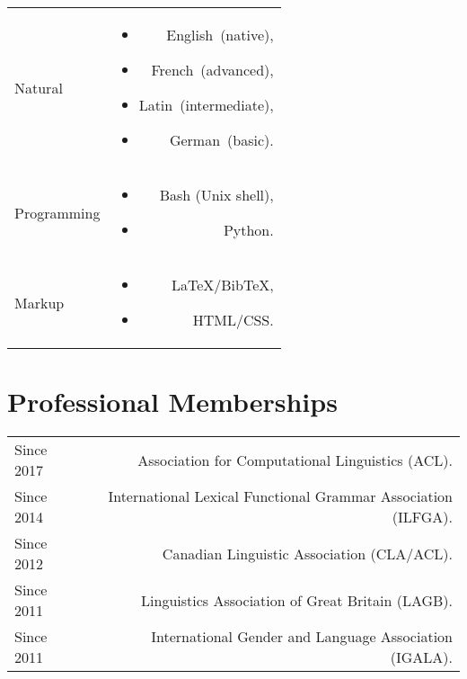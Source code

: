 \documentclass[11pt,a4paper]{article}
\makeatletter
\newenvironment{cvsection}{%
  \setlength{\extrarowheight}{0.70ex}
  \begin{longtable}[l]{@{} L R @{}}
}{%
  \end{longtable}
}
\newlength{\squish}
\newenvironment{reviewlist}
{%
\vspace*{\squish}%
\begin{itemize}[noitemsep,label={},nosep,left=0pt .. \parindent]%
}
{%
\end{itemize}
}
\newenvironment{languagelist}
{\begin{reviewlist}}
{\end{reviewlist}}
\newcommand{\Label}[1]{%
\textnormal{#1}%
}
\makeatother
\begin{document}
\begin{cvsection}
  \Label{Natural}      &    \begin{languagelist}
                                \item English~(native),
                                \item French~(advanced),
                                \item Latin~(intermediate),
                                \item German~(basic).
                            \end{languagelist}
                                \\[\squish]
  \Label{Programming}  &    \begin{languagelist}
                                \item Bash (Unix shell),
                                \item Python.
                            \end{languagelist}
                                \\[\squish]
  \Label{Markup}       &    \begin{languagelist}
                                \item \LaTeX*\slash Bib\TeX*,
                                \item HTML\slash CSS.
                            \end{languagelist}
\end{cvsection}



\section*{Professional Memberships}

\begin{cvsection}
  Since 2017	& Association for Computational Linguistics (ACL).\\
  Since 2014    & International Lexical Functional Grammar Association (ILFGA).\\
  Since 2012 	& Canadian Linguistic Association (CLA\slash ACL).\\
  Since 2011 	& Linguistics Association of Great Britain (LAGB).\\
  Since 2011 	& International Gender and Language Association (IGALA).\\
\end{cvsection}
\end{document}
